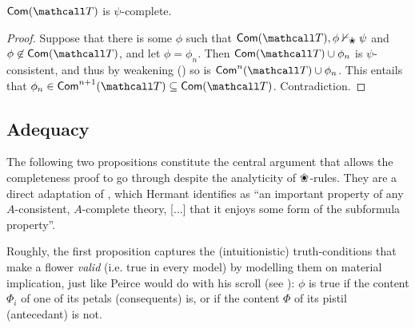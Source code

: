 \begin{lemma}
  $\completion{\tT}$ is $\psi$-complete.
\end{lemma}
\begin{proof}
  Suppose that there is some $\phi$ such that $\completion{\tT}, \phi
  \nvdash_\Nature \psi$ and $\phi \not\in \completion{\tT}$, and let $\phi =
  \phi_n$. Then $\completion{\tT} \cup \phi_n$ is $\psi$-consistent, and thus by
  weakening () so is $\ncompletion{\tT}{n} \cup \phi_n$. This
  entails that $\phi_n \in \ncompletion{\tT}{n+1} \subseteq \completion{\tT}$.
  Contradiction.
\end{proof}

\subsection{Adequacy}

The following two propositions constitute the central argument that allows the
completeness proof to go through despite the analyticity of $\Nature$-rules.
They are a direct adaptation of \cite[Proposition 7]{hutchison_semantic_2005},
which Hermant identifies as ``an important property of any $A$-consistent,
$A$-complete theory, [...] that it enjoys some form of the subformula
property''.

Roughly, the first proposition captures the (intuitionistic) truth-conditions
that make a flower \emph{valid} (i.e. true in every model) by modelling them on
material implication, just like Peirce would do with his scroll (see
): $\phi$ is true if the content $\Phi_i$ of one of its petals
(consequents) is, or if the content $\Phi$ of its pistil (antecedant) is not.


